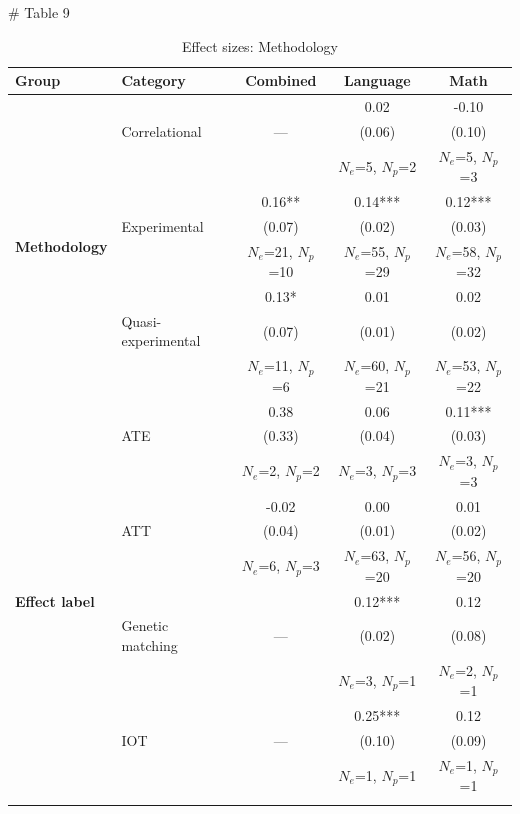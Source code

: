 # Table 9

\renewcommand{\arraystretch}{0.9} %
\setlength{\tabcolsep}{5pt}       %
\small                            %

\begin{table}[htbp]
\centering
\caption{Effect sizes: Methodology}
\medskip
\begin{tabular*}{\linewidth}{@{\extracolsep{\fill}} l l c c c @{}}
\toprule
\textbf{Group} & \textbf{Category} & \textbf{Combined} & \textbf{Language} & \textbf{Math} \\
\midrule
\multirow{9}{*}{\textbf{Methodology}}
  &  &  & 0.02 & -0.10 \\
  & Correlational & --- & (0.06) & (0.10) \\
  &  &  & $N_e$=5, $N_p$=2 & $N_e$=5, $N_p$=3 \\
\cmidrule(lr){2-5}
  &  & 0.16** & 0.14*** & 0.12*** \\
  & Experimental & (0.07) & (0.02) & (0.03) \\
  &  & $N_e$=21, $N_p$=10 & $N_e$=55, $N_p$=29 & $N_e$=58, $N_p$=32 \\
\cmidrule(lr){2-5}
  &  & 0.13* & 0.01 & 0.02 \\
  & Quasi-experimental & (0.07) & (0.01) & (0.02) \\
  &  & $N_e$=11, $N_p$=6 & $N_e$=60, $N_p$=21 & $N_e$=53, $N_p$=22 \\
\midrule
\multirow{27}{*}{\textbf{Effect label}}
  &  & 0.38 & 0.06 & 0.11*** \\
  & ATE & (0.33) & (0.04) & (0.03) \\
  &  & $N_e$=2, $N_p$=2 & $N_e$=3, $N_p$=3 & $N_e$=3, $N_p$=3 \\
\cmidrule(lr){2-5}
  &  & -0.02 & 0.00 & 0.01 \\
  & ATT & (0.04) & (0.01) & (0.02) \\
  &  & $N_e$=6, $N_p$=3 & $N_e$=63, $N_p$=20 & $N_e$=56, $N_p$=20 \\
\cmidrule(lr){2-5}
  &  &  & 0.12*** & 0.12 \\
  & Genetic matching & --- & (0.02) & (0.08) \\
  &  &  & $N_e$=3, $N_p$=1 & $N_e$=2, $N_p$=1 \\
\cmidrule(lr){2-5}
  &  &  & 0.25*** & 0.12 \\
  & IOT & --- & (0.10) & (0.09) \\
  &  &  & $N_e$=1, $N_p$=1 & $N_e$=1, $N_p$=1 \\
\cmidrule(lr){2-5}

\end{tabular*}
\end{table}
